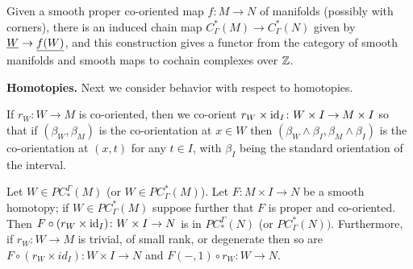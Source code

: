 \begin{corollary}
Given a smooth proper co-oriented map $f \colon M \to N$ of manifolds (possibly with corners), there is an induced chain map $C^*_\Gamma(M) \to C^*_\Gamma(N)$ given by $\underline{W} \to \underline{f(W)}$, and this construction gives a functor from the category of smooth manifolds and smooth maps to cochain complexes over $\mathbb{Z}$.
\end{corollary}



\noindent\textbf{Homotopies.} Next we consider behavior with respect to homotopies.

\begin{convention}
If $r_W \colon W \to M$ is co-oriented, then we co-orient $r_W \times \mathrm{id}_I \colon W \times I \to M \times I$ so that if $(\beta_W,\beta_M)$ is the co-orientation at $x \in W$ then $(\beta_W \wedge \beta_I,\beta_M \wedge \beta_I)$ is the co-orientation at $(x,t)$ for any $t \in I$, with $\beta_I$ being the standard orientation of the interval.
\end{convention}


\begin{lemma}\label{L: dessicated homotopy}
	Let $W \in PC_*^\Gamma(M)$ (or $W \in PC^*_\Gamma(M)$).
Let $F \colon M \times I \to N$ be a smooth homotopy; if $W \in PC^*_\Gamma(M)$ suppose further that $F$ is proper and co-oriented. Then $F \circ (r_W \times \mathrm{id}_I) \colon W \times I \to N$ is in $PC_*^\Gamma(N)$ (or $PC^*_\Gamma(N))$. Furthermore,
if $r_W: W \to M$ is trivial, of small rank, or
	degenerate then so are
	$F \circ (r_W \times id_I) \colon W \times I \to N$ and $F(-,1) \circ r_W: W \to N$.
\end{lemma}

